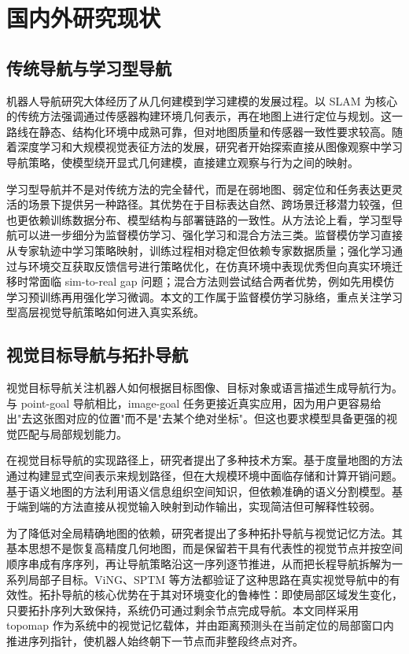 \section{国内外研究现状}

\subsection{传统导航与学习型导航}

机器人导航研究大体经历了从几何建模到学习建模的发展过程。以 SLAM 为核心的传统方法强调通过传感器构建环境几何表示，再在地图上进行定位与规划\cite{thrun2005probabilistic,orbslam3_2021}。这一路线在静态、结构化环境中成熟可靠，但对地图质量和传感器一致性要求较高。随着深度学习和大规模视觉表征方法的发展，研究者开始探索直接从图像观察中学习导航策略，使模型绕开显式几何建模，直接建立观察与行为之间的映射\cite{zhu2017targetdriven,anderson2018evaluation}。

学习型导航并不是对传统方法的完全替代，而是在弱地图、弱定位和任务表达更灵活的场景下提供另一种路径。其优势在于目标表达自然、跨场景迁移潜力较强，但也更依赖训练数据分布、模型结构与部署链路的一致性。从方法论上看，学习型导航可以进一步细分为监督模仿学习、强化学习和混合方法三类。监督模仿学习直接从专家轨迹中学习策略映射，训练过程相对稳定但依赖专家数据质量；强化学习通过与环境交互获取反馈信号进行策略优化，在仿真环境中表现优秀但向真实环境迁移时常面临 sim-to-real gap 问题；混合方法则尝试结合两者优势，例如先用模仿学习预训练再用强化学习微调。本文的工作属于监督模仿学习脉络，重点关注学习型高层视觉导航策略如何进入真实系统。

\subsection{视觉目标导航与拓扑导航}

视觉目标导航关注机器人如何根据目标图像、目标对象或语言描述生成导航行为\cite{zhu2017targetdriven,shah2021ving}。与 point-goal 导航相比，image-goal 任务更接近真实应用，因为用户更容易给出"去这张图对应的位置"而不是"去某个绝对坐标"。但这也要求模型具备更强的视觉匹配与局部规划能力。

在视觉目标导航的实现路径上，研究者提出了多种技术方案。基于度量地图的方法通过构建显式空间表示来规划路径，但在大规模环境中面临存储和计算开销问题。基于语义地图的方法利用语义信息组织空间知识，但依赖准确的语义分割模型。基于端到端的方法直接从视觉输入映射到动作输出，实现简洁但可解释性较弱。

为了降低对全局精确地图的依赖，研究者提出了多种拓扑导航与视觉记忆方法\cite{savinov2018sptm,chaplot2020nts}。其基本思想不是恢复高精度几何地图，而是保留若干具有代表性的视觉节点并按空间顺序串成有序序列，再让导航策略沿这一序列逐节推进，从而把长程导航拆解为一系列局部子目标。ViNG、SPTM 等方法都验证了这种思路在真实视觉导航中的有效性\cite{savinov2018sptm,shah2021ving}。拓扑导航的核心优势在于其对环境变化的鲁棒性：即使局部区域发生变化，只要拓扑序列大致保持，系统仍可通过剩余节点完成导航。本文同样采用 topomap 作为系统中的视觉记忆载体，并由距离预测头在当前定位的局部窗口内推进序列指针，使机器人始终朝下一节点而非整段终点对齐。

